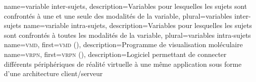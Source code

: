 %
{%
	name={variable inter-sujets},%
	description={Variables pour lesquelles les sujets sont confrontés à une et une seule des modalités de la variable},%
	plural={variables inter-sujets}%
}
%
{%
	name={variable intra-sujets},%
	description={Variables pour lesquelles les sujets sont confrontés à toutes les modalités de la variable},%
	plural={variables intra-sujets}%
}
%
{%
	name={\textsc{vmd}},%
	first={\textsc{vmd} ()},%
	description={Programme de visualisation moléculaire }%
}
%
{%
	name={\textsc{vrpn}},%
	first={\textsc{vrpn} ()},%
	description={Logiciel permettant de connecter différents périphériques de réalité virtuelle à une même application sous forme d'une architecture client/serveur }%
}
